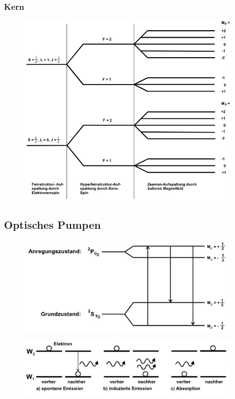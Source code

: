 \subsubsection{Kern}

\begin{figure}[H]
	\centering
	\includegraphics[width=0.7\linewidth]{content/grafik/hyperfein.jpg}
	\caption{\cite{pumpen}}
	\label{fig:hyperfein}
\end{figure}

\subsection{Optisches Pumpen}

\begin{figure}[H]
	\centering
	\includegraphics[width=0.65\linewidth]{content/grafik/pumpen.jpg}
	\caption{\cite{pumpen}}
	\label{fig:pumpen}
\end{figure}

\begin{figure}[H]
	\centering
	\includegraphics[width=0.75\linewidth]{content/grafik/uebergang.jpg}
	\caption{\cite{pumpen}}
	\label{fig:uebergang}
\end{figure}

